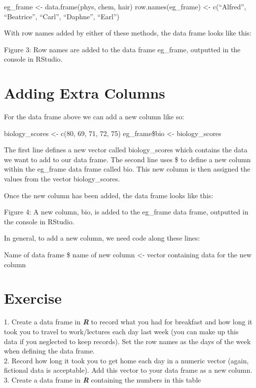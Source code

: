 \documentclass[
]{book}
\begin{document}
eg\_frame \textless- data.frame(phys, chem, hair)
row.names(eg\_frame) \textless- c(``Alfred'', ``Beatrice'', ``Carl'', ``Daphne'', ``Earl'')

With row names added by either of these methods, the data frame looks like this:

Figure 3: Row names are added to the data frame eg\_frame, outputted in the console in RStudio.

\section{Adding Extra Columns}\label{adding-extra-columns}

For the data frame above we can add a new column like so:

biology\_scores \textless- c(80, 69, 71, 72, 75)
eg\_frame\$bio \textless- biology\_scores

The first line defines a new vector called biology\_scores which contains the data we want to add to our data frame. The second line uses \$ to define a new column within the eg\_frame data frame called bio. This new column is then assigned the values from the vector biology\_scores.

Once the new column has been added, the data frame looks like this:

Figure 4: A new column, bio, is added to the eg\_frame data frame, outputted in the console in RStudio.

In general, to add a new column, we need code along these lines:

Name of data frame \$ name of new column \textless- vector containing data for the new column

\section{Exercise}\label{exercise-4}

1. Create a data frame in \textbf{\emph{R}} to record what you had for breakfast and how long it took you to travel to work/lectures each day last week (you can make up this data if you neglected to keep records). Set the row names as the days of the week when defining the data frame.\\
2. Record how long it took you to get home each day in a numeric vector (again, fictional data is acceptable). Add this vector to your data frame as a new column.\\
3. Create a data frame in \textbf{\emph{R}} containing the numbers in this table
\end{document}
